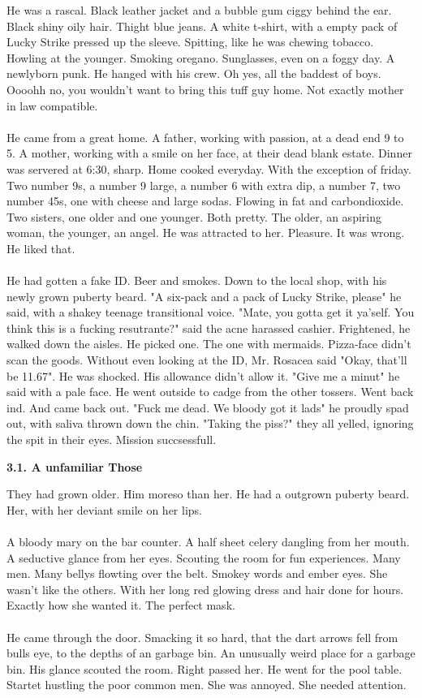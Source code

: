 \documentclass[]{article}
\begin{document}
He was a rascal. Black leather jacket and a bubble gum ciggy behind the ear. Black shiny oily hair. Thight blue jeans. A white t-shirt, with a empty pack of Lucky Strike pressed up the sleeve. Spitting, like he was chewing tobacco. Howling at the younger. Smoking oregano. Sunglasses, even on a foggy day. A newlyborn punk. He hanged with his crew. Oh yes, all the baddest of boys. Oooohh no, you wouldn't want to bring this tuff guy home. Not exactly mother in law compatible. 
\\ \\
He came from a great home. A father, working with passion, at a dead end 9 to 5. A mother, working with a smile on her face, at their dead blank estate. Dinner was servered at 6:30, sharp. Home cooked everyday. With the exception of friday. Two number 9s, a number 9 large, a number 6 with extra dip, a number 7, two number 45s, one with cheese and large sodas. Flowing in fat and carbondioxide. Two sisters, one older and one younger. Both pretty. The older, an aspiring woman, the younger, an angel. He was attracted to her. Pleasure. It was wrong. He liked that.
\\ \\
He had gotten a fake ID. Beer and smokes. Down to the local shop, with his newly grown puberty beard. "A six-pack and a pack of Lucky Strike, please" he said, with a shakey teenage transitional voice. "Mate, you gotta get it ya'self. You think this is a fucking resutrante?" said the acne harassed cashier. Frightened, he walked down the aisles. He picked one. The one with mermaids. Pizza-face didn't scan the goods. Without even looking at the ID, Mr. Rosacea said "Okay, that'll be 11.67". He was shocked. His allowance didn't allow it. "Give me a minut" he said with a pale face. He went outside to cadge from the other tossers. Went back ind. And came back out. "Fuck me dead. We bloody got it lads" he proudly spad out, with saliva thrown down the chin. "Taking the piss?" they all yelled, ignoring the spit in their eyes. Mission succsessfull.

\newpage

\begin{center}
	\textbf{3.1. A unfamiliar Those}
\end{center}

They had grown older. Him moreso than her. He had a outgrown puberty beard. Her, with her deviant smile on her lips. 
\\ \\
A bloody mary on the bar counter. A half sheet celery dangling from her mouth. A seductive glance from her eyes. Scouting the room for fun experiences. Many men. Many bellys flowting over the belt. Smokey words and ember eyes. She wasn't like the others. With her long red glowing dress and hair done for hours. Exactly how she wanted it. The perfect mask. 
\\ \\
He came through the door. Smacking it so hard, that the dart arrows fell from bulls eye, to the depths of an garbage bin. An unusually weird place for a garbage bin. His glance scouted the room. Right passed her. He went for the pool table. Startet hustling the poor common men. She was annoyed. She needed attention. 
\end{document}
